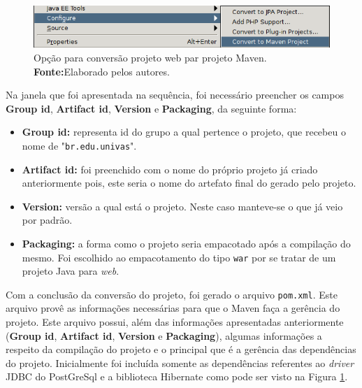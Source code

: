 	\begin{figure}[h!]
		\centerline{\includegraphics[scale=0.8]{./imagens/2_q_metodologico/4_procedimentos_resultados/43_webservice/432_desenvolvimento/desws18.png}}
		\caption[Opção para conversão projeto web par projeto Maven]{Opção para conversão projeto web par projeto Maven.
			\textbf{Fonte:}Elaborado pelos autores.}
		\label{fig:desws18}
	\end{figure}
	
	\par Na janela que foi apresentada na sequência, foi necessário preencher os
campos \textbf{Group id}, \textbf{Artifact id}, \textbf{Version} e
\textbf{Packaging}, da seguinte forma:

	\begin{itemize}
	  \item \textbf{Group id:} representa id do grupo a qual pertence o projeto,
	  que recebeu o nome de "\texttt{br.edu.univas}".
	  \item \textbf{Artifact id:} foi preenchido com o nome do próprio projeto já
	  criado anteriormente pois, este seria o nome do artefato final do gerado pelo
	  projeto.
	  \item \textbf{Version:} versão a qual está o projeto. Neste caso manteve-se
	  o que já veio por padrão.
	  \item \textbf{Packaging:} a forma como o projeto seria empacotado após a
	  compilação do mesmo. Foi escolhido ao empacotamento do tipo \texttt{war} por
	  se tratar de um projeto Java para \textit{web}.
	\end{itemize}
		
	\par Com a conclusão da conversão do projeto, foi gerado o arquivo
\texttt{pom.xml}. Este arquivo provê as informações necessárias para que o Maven
faça a gerência do projeto. Este arquivo possui, além das informações
apresentadas anteriormente (\textbf{Group id}, \textbf{Artifact id},
\textbf{Version} e \textbf{Packaging}), algumas informações a respeito da
compilação do projeto e o principal que é a gerência das dependências do
projeto. Inicialmente foi incluída somente as dependências referentes ao
\textit{driver} JDBC do PostGreSql e a biblioteca Hibernate como pode ser visto
na Figura \ref{fig:desws18}.
	
